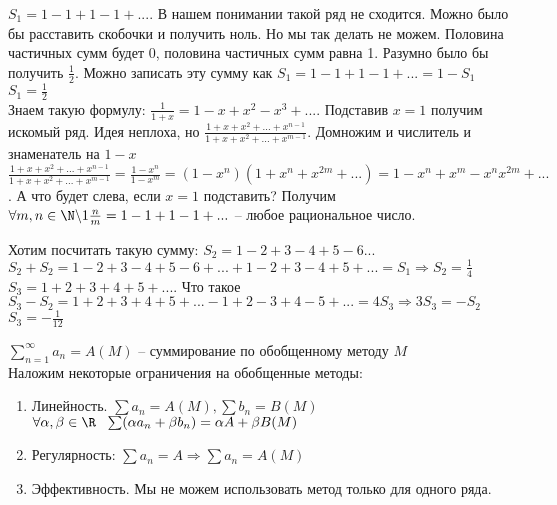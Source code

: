 \begin{Example}
    $S_1  = 1 - 1 + 1 - 1 + ...$. В нашем понимании такой ряд не сходится. Можно было бы расставить скобочки и получить ноль. Но мы так делать не можем.
    Половина частичных сумм будет 0, половина частичных сумм равна 1. Разумно было бы получить $\frac{1}{2}$. 
    Можно записать эту сумму как $S_1 = 1 - 1 + 1 - 1 + ... = 1 - S_1$\\
    $S_1 = \frac{1}{2}$\\
    Знаем такую формулу: $\frac{1}{1+x} = 1 - x + x^2 - x^3 + ...$. Подставив $x = 1$ получим искомый ряд. 
    Идея неплоха, но $\frac{1+x+x^2+...+x^{n-1}}{1 + x + x^2 + ... + x^{m-1}}$. Домножим и числитель и знаменатель  на $1-x$\\
    $\frac{1+x+x^2+...+x^{n-1}}{1 + x + x^2 + ... + x^{m-1}} = \frac{1-x^n}{1-x^m} = (1-x^n)(1 + x^n + x^{2m} + ...) = 1 - x^n + x^m - x^n x^{2m} + ...$. 
    А что будет слева, если $x = 1$ подставить? Получим $\forall m,n \in \N \backslash {1} \frac{n}{m} = 1 - 1 + 1 - 1 +...$ -- любое рациональное число. 
\end{Example}

\begin{Example}
    Хотим посчитать такую сумму: $S_2 = 1 - 2 + 3 - 4 + 5 - 6...$
    $S_2 + S_2 = 1 - 2 + 3 - 4 + 5 -6 + ... + 1 - 2 + 3 - 4 + 5 + ... = S_1 \Rightarrow S_2 = \frac{1}{4}$
    $S_3 = 1 + 2 + 3 + 4 + 5 +...$. Что такое $S_3 - S_2 = 1 + 2 + 3 + 4 + 5 + ... - 1 + 2 - 3 + 4 - 5 + ... = 4 S_3 \Rightarrow 3 S_3 = - S_2$\\
    $S_3 = - \frac{1}{12}$
\end{Example}

\begin{Def} 
    $\sum_{n=1}^{\infty} a_n = A (M)$ -- суммирование по обобщенному методу $M$\\

    Наложим некоторые ограничения на обобщенные методы: 
    \begin{enumerate}
        \item Линейность. $\sum a_n = A (M), \sum b_n = B (M)$\\
        $\forall \alpha, \beta \in \R \ \ \sum (\alpha a_n + \beta b_n) = \alpha A + \beta B (M)$
        \item Регулярность: $\sum a_n = A \Rightarrow \sum a_n = A (M)$
        \item Эффективность. Мы не можем использовать метод только для одного ряда. 
    \end{enumerate}
\end{Def} 

